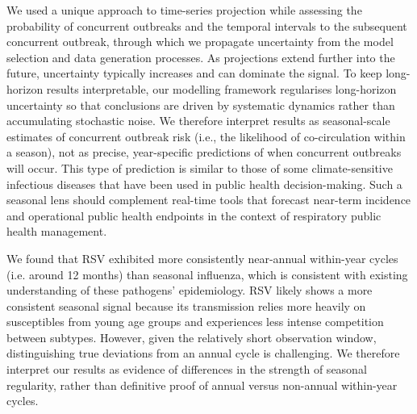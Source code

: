 We used a unique approach to time-series projection while assessing the probability of concurrent outbreaks and the temporal intervals to the subsequent concurrent outbreak, through which we propagate uncertainty from the model selection and data generation processes.
As projections extend further into the future, uncertainty typically increases and can dominate the signal. 
To keep long-horizon results interpretable, our modelling framework regularises long-horizon uncertainty so that conclusions are driven by systematic dynamics rather than accumulating stochastic noise.
We therefore interpret results as seasonal-scale estimates of concurrent outbreak risk (i.e., the likelihood of co-circulation within a season), not as precise, year-specific predictions of when concurrent outbreaks will occur.
This type of prediction is similar to those of some climate-sensitive infectious diseases that have been used in public health decision-making. 
Such a seasonal lens should complement real-time tools that forecast near-term incidence and operational public health endpoints in the context of respiratory public health management.


We found that RSV exhibited more consistently near-annual within-year cycles (i.e. around 12 months) than seasonal influenza, which is consistent with existing understanding of these pathogens' epidemiology. 
RSV likely shows a more consistent seasonal signal because its transmission relies more heavily on susceptibles from young age groups and experiences less intense competition between subtypes. 
However, given the relatively short observation window, distinguishing true deviations from an annual cycle is challenging. 
We therefore interpret our results as evidence of differences in the strength of seasonal regularity, rather than definitive proof of annual versus non-annual within-year cycles.

